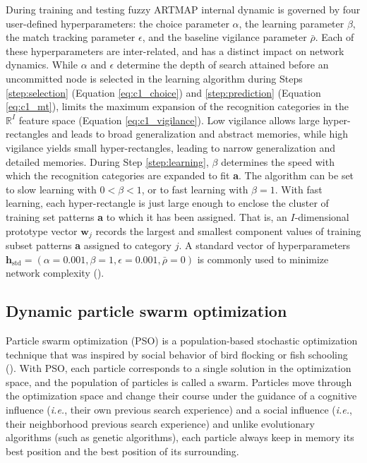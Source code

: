 During training and testing fuzzy ARTMAP internal dynamic is governed by four user-defined hyperparameters: the choice parameter $\alpha$, the learning parameter $\beta$, the match tracking parameter $\epsilon$, and the baseline vigilance parameter $\bar{\rho}$. Each of these hyperparameters are inter-related, and has a distinct impact on network dynamics. While $\alpha$ and $\epsilon$ determine the depth of search attained before an uncommitted node is selected in the learning algorithm during Steps \ref{step:selection} (Equation \ref{eq:c1_choice}) and \ref{step:prediction} (Equation \ref{eq:c1_mt}),  limits the maximum expansion of the recognition categories in the $\mathbb{R}^I$ feature space (Equation \ref{eq:c1_vigilance}). Low vigilance allows large hyper-rectangles and leads to broad generalization and abstract memories, while high vigilance yields small hyper-rectangles, leading to narrow generalization and detailed memories. During Step \ref{step:learning}, $\beta$ determines the speed with which the recognition categories are expanded to fit \textbf{a}. The algorithm can be set to slow learning with $0<\beta<1$, or to fast learning with $\beta = 1$. With fast learning, each hyper-rectangle is just large enough to enclose the cluster of training set patterns \textbf{a} to which it has been assigned. That is, an $I$-dimensional prototype vector $\textbf{w}_j$ records the largest and smallest component values of training subset patterns \textbf{a} assigned to category $j$. A standard vector of hyperparameters $\textbf{h}_\text{std} = \left(\alpha = 0.001, \beta=1,\epsilon=0.001,\bar{\rho}=0\right)$ is commonly used to minimize network complexity (\cite{carpenter92}).

\subsection{Dynamic particle swarm optimization}
\label{sec:c1_dpso}

Particle swarm optimization (PSO) is a population-based stochastic optimization technique that was inspired by social behavior of bird flocking or fish schooling (\cite{kennedy95, kennedy07}). With PSO, each particle corresponds to a single solution in the optimization space, and the population of particles is called a swarm. Particles move through the optimization space and change their course under the guidance of a cognitive influence (\emph{i.e.}, their own previous search experience) and a social influence (\emph{i.e.}, their neighborhood previous search experience) and unlike evolutionary algorithms (such as genetic algorithms), each particle always keep in memory its best position and the best position of its surrounding.

